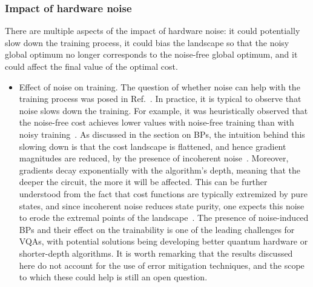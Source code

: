 \documentclass[prx,twocolumn,floatfix,superscriptaddress,longbibliography]{revtex4-1}
\newcommand{\<}{\langle}
\renewcommand{\>}{\rangle}
\begin{document}
\subsubsection{ Impact of hardware noise}
   
There are multiple aspects of the impact of hardware noise: it could potentially slow down the training process, it could bias the landscape so that the noisy global optimum no longer corresponds to the noise-free global optimum, and it could affect the final value of the optimal cost. 
    
    
\begin{itemize}   
\item{Effect of noise on training.}     The question of whether noise can help with the training process was posed in Ref.~\cite{gentini2019noise}. In practice, it is typical to observe that noise slows down the training. For example, it was heuristically observed that the noise-free cost achieves lower values with noise-free training than with noisy training~\cite{kubler2019adaptive,arrasmith2020operator,fontana2020optimizing}. As discussed in the section on BPs, the intuition behind this slowing down is that the cost landscape is flattened, and hence gradient magnitudes are reduced, by the presence of incoherent noise~\cite{xue2019effects,marshall2020characterizing,wang2020noise}. Moreover, gradients decay exponentially with the algorithm's depth, meaning that the deeper the circuit, the more it will be affected. This can be further understood from the fact that cost functions are typically extremized by pure states, and since incoherent noise reduces state purity, one expects this noise to erode the extremal points of the landscape~\cite{franca2020limitations}. The presence of noise-induced BPs and their effect on the trainability is one of the leading challenges for VQAs, with potential solutions being developing better quantum hardware or shorter-depth algorithms. It is worth remarking  that the results discussed here do not account for the use of error mitigation techniques, and the scope to which these could help is still an open question.  


    
    

\end{itemize}
\end{document}
